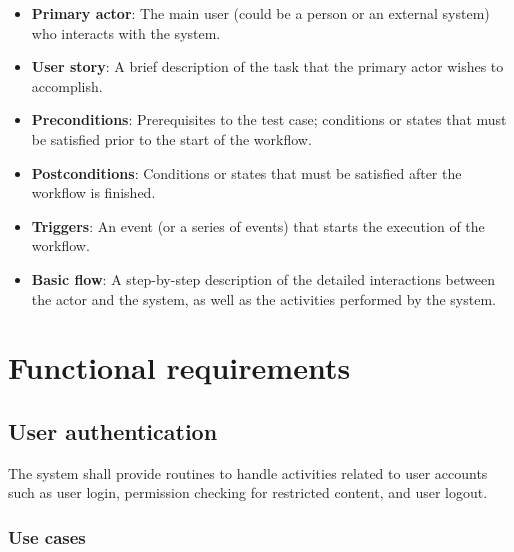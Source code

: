 \begin{itemize}

\item \textbf{Primary actor}:
The main user (could be a person or an external system) who interacts with the
system.

\item \textbf{User story}:
A brief description of the task that the primary actor wishes to accomplish.

\item \textbf{Preconditions}:
Prerequisites to the test case;
conditions or states that must be satisfied prior to the start of the workflow.

\item \textbf{Postconditions}:
Conditions or states that must be satisfied after the workflow is finished.

\item \textbf{Triggers}:
An event (or a series of events) that starts the execution of the workflow.

\item \textbf{Basic flow}:
A step-by-step description of the detailed interactions between the actor and
the system, as well as the activities performed by the system.

\end{itemize}

\section{Functional requirements}
\label{FUNCREQS}

\subsection{User authentication}

The system shall provide routines to handle activities related to user accounts
such as user login, permission checking for restricted content, and user logout.

\subsubsection{Use cases}

